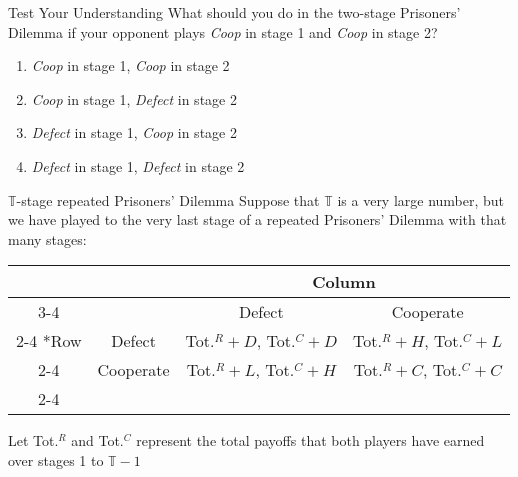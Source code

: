 \begin{frame}{Test Your Understanding}
  What should you do in the two-stage Prisoners' Dilemma 
  if your opponent plays \textit{Coop} in stage 1 and \textit{Coop} in stage 2?
  \begin{enumerate}[label=\textbf{\alph*)}]
    \item \textit{Coop} in stage 1, \textit{Coop} in stage 2
    \item \textit{Coop} in stage 1, \textit{Defect} in stage 2
    \item \textit{Defect} in stage 1, \textit{Coop} in stage 2
    \item \textit{Defect} in stage 1, \textit{Defect} in stage 2
  \end{enumerate}
\end{frame}

\begin{frame}{$\mathbb{T}$-stage repeated Prisoners' Dilemma}
  Suppose that $\mathbb{T}$ is a very large number, but we have played to the very last stage of a repeated Prisoners' Dilemma with that many stages:
  \begin{center}
    \begin{tabular}{*{4}{c|}}
      \multicolumn{2}{c}{} & \multicolumn{2}{c}{Column} \\ \cline{3-4}
      \multicolumn{1}{c}{} &        & Defect & Cooperate \\ \cline{2-4}
      \multirow{2}*{Row} & Defect   & Tot.$^R + D$, Tot.$^C + D$ & Tot.$^R + H$, Tot.$^C + L$ \\ \cline{2-4}
                         & Cooperate& Tot.$^R + L$, Tot.$^C + H$ & Tot.$^R + C$, Tot.$^C + C$ \\ \cline{2-4}
    \end{tabular} 
  \end{center}
  Let Tot.$^R$ and Tot.$^C$ represent the total payoffs that both players have earned over 
  stages 1 to $\mathbb{T} -1$
\end{frame}
